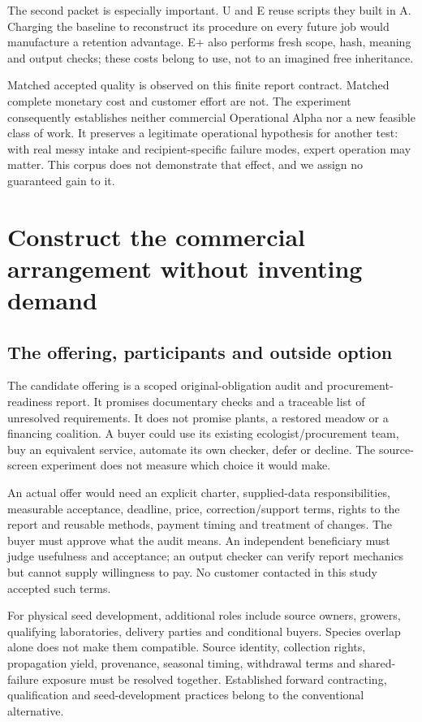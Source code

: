 \documentclass[11pt]{article}
\begin{document}
The second packet is especially important. U and E reuse scripts they built in A. Charging the baseline to reconstruct its procedure on every future job would manufacture a retention advantage. E+ also performs fresh scope, hash, meaning and output checks; these costs belong to use, not to an imagined free inheritance.

Matched accepted quality is observed on this finite report contract. Matched complete monetary cost and customer effort are not. The experiment consequently establishes neither commercial Operational Alpha nor a new feasible class of work. It preserves a legitimate operational hypothesis for another test: with real messy intake and recipient-specific failure modes, expert operation may matter. This corpus does not demonstrate that effect, and we assign no guaranteed gain to it.

\section{Construct the commercial arrangement without inventing demand}
\subsection{The offering, participants and outside option}
The candidate offering is a scoped original-obligation audit and procurement-readiness report. It promises documentary checks and a traceable list of unresolved requirements. It does not promise plants, a restored meadow or a financing coalition. A buyer could use its existing ecologist/procurement team, buy an equivalent service, automate its own checker, defer or decline. The source-screen experiment does not measure which choice it would make.

An actual offer would need an explicit charter, supplied-data responsibilities, measurable acceptance, deadline, price, correction/support terms, rights to the report and reusable methods, payment timing and treatment of changes. The buyer must approve what the audit means. An independent beneficiary must judge usefulness and acceptance; an output checker can verify report mechanics but cannot supply willingness to pay. No customer contacted in this study accepted such terms.

For physical seed development, additional roles include source owners, growers, qualifying laboratories, delivery parties and conditional buyers. Species overlap alone does not make them compatible. Source identity, collection rights, propagation yield, provenance, seasonal timing, withdrawal terms and shared-failure exposure must be resolved together. Established forward contracting, qualification and seed-development practices belong to the conventional alternative.\cite{nasem,fhwa,blm}
\end{document}
